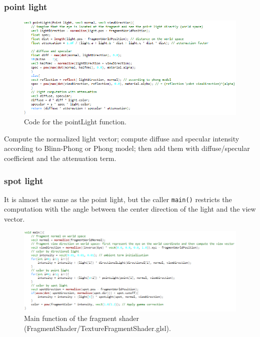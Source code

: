 \documentclass[11pt]{article}
\begin{document}
\subsubsection{point light} \label{sssec:1.2.2}
\begin{figure}[htb]
	\begin{center}
		\includegraphics[width=1.0\linewidth]{point.png}
	\end{center}
	\caption{Code for the pointLight function.}
\end{figure}
Compute the normalized light vector; compute diffuse and specular intensity according to Blinn-Phong or Phong model; then add them with diffuse/specular coefficient and the attenuation term.
\subsubsection{spot light} \label{sssec:1.2.3}
It is almost the same as the point light, but the caller \texttt{main()} restricts the computation with the angle between the center direction of the light and the view vector.

\begin{figure}[htb]
	\begin{center}
		\includegraphics[width=1.0\linewidth]{main.png}
	\end{center}
	\caption{Main function of the fragment shader (FragmentShader/TextureFragmentShader.glsl).}
\end{figure}
\end{document}
